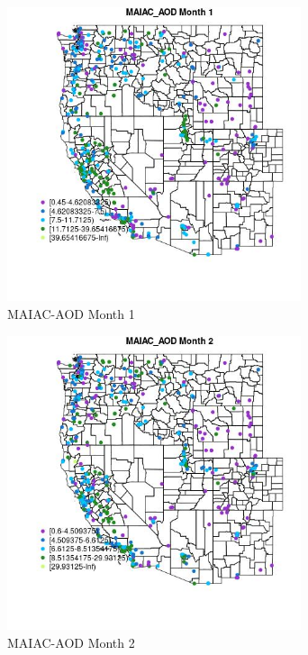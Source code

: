 \begin{figure} 
\centering  
\includegraphics[width=0.77\textwidth]{Code_Outputs/ML_input_report_ML_input_PM25_Step5_part_d_de_duplicated_aves_ML_input_MapObsMo1MAIAC_AOD.jpg} 
\caption{\label{fig:ML_input_report_ML_input_PM25_Step5_part_d_de_duplicated_aves_ML_inputMapObsMo1MAIAC_AOD}MAIAC-AOD Month 1} 
\end{figure} 
 

\clearpage 

\begin{figure} 
\centering  
\includegraphics[width=0.77\textwidth]{Code_Outputs/ML_input_report_ML_input_PM25_Step5_part_d_de_duplicated_aves_ML_input_MapObsMo2MAIAC_AOD.jpg} 
\caption{\label{fig:ML_input_report_ML_input_PM25_Step5_part_d_de_duplicated_aves_ML_inputMapObsMo2MAIAC_AOD}MAIAC-AOD Month 2} 
\end{figure} 
 

